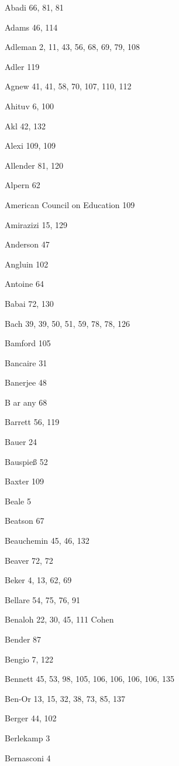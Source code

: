\begin{theindex}

\item Abadi 66, 81, 81
\item Adams 46, 114
\item Adleman 2, 11, 43, 56, 68, 69, 79, 108
\item Adler 119
\item Agnew 41, 41, 58, 70, 107, 110, 112
\item Ahituv 6, 100
\item Akl 42, 132
\item Alexi 109, 109
\item Allender 81, 120
\item Alpern 62
\item {American Council on Education} 109
\item Amirazizi 15, 129
\item Anderson 47
\item Angluin 102
\item Antoine 64
\item Babai 72, 130
\item Bach 39, 39, 50, 51, 59, 78, 78, 126
\item Bamford 105
\item Bancaire 31
\item Banerjee 48
\item B{ a}r{ a}ny 68
\item Barrett 56, 119
\item Bauer 24
\item Bauspie{\ss } 52
\item Baxter 109
\item Beale 5
\item Beatson 67
\item Beauchemin 45, 46, 132
\item Beaver 72, 72
\item Beker 4, 13, 62, 69
\item Bellare 54, 75, 76, 91
\item Benaloh 22, 30, 45, 111
 Cohen
\item Bender 87
\item Bengio 7, 122
\item Bennett 45, 53, 98, 105, 106, 106, 106, 106, 135
\item Ben-Or 13, 15, 32, 38, 73, 85, 137
\item Berger 44, 102
\item Berlekamp 3
\item Bernasconi 4

\end{theindex}
